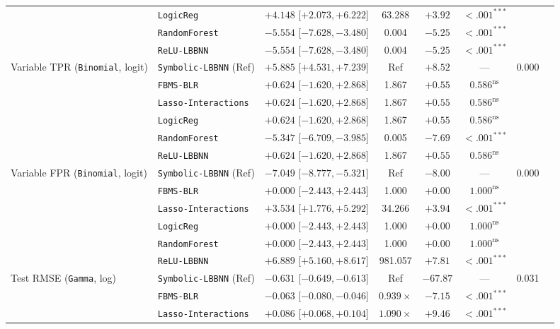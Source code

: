 \begin{table}[htbp]
{{\begin{tabular}{llcccccc}
 & \texttt{LogicReg} & $+4.148$ [$+2.073, +6.222$] & 63.288 & $+3.92$ & $<.001^{***}$ &  \\
 & \texttt{RandomForest} & $-5.554$ [$-7.628, -3.480$] & 0.004 & $-5.25$ & $<.001^{***}$ &  \\
 & \texttt{ReLU-LBBNN} & $-5.554$ [$-7.628, -3.480$] & 0.004 & $-5.25$ & $<.001^{***}$ &  \\
\midrule
Variable TPR (\texttt{Binomial}, logit) & \texttt{Symbolic-LBBNN} (Ref) & $+5.885$ [$+4.531, +7.239$] & Ref & $+8.52$ & --- & 0.000 \\
 & \texttt{FBMS-BLR} & $+0.624$ [$-1.620, +2.868$] & 1.867 & $+0.55$ & $0.586^{\text{ns}}$ &  \\
 & \texttt{Lasso-Interactions} & $+0.624$ [$-1.620, +2.868$] & 1.867 & $+0.55$ & $0.586^{\text{ns}}$ &  \\
 & \texttt{LogicReg} & $+0.624$ [$-1.620, +2.868$] & 1.867 & $+0.55$ & $0.586^{\text{ns}}$ &  \\
 & \texttt{RandomForest} & $-5.347$ [$-6.709, -3.985$] & 0.005 & $-7.69$ & $<.001^{***}$ &  \\
 & \texttt{ReLU-LBBNN} & $+0.624$ [$-1.620, +2.868$] & 1.867 & $+0.55$ & $0.586^{\text{ns}}$ &  \\
\midrule
Variable FPR (\texttt{Binomial}, logit) & \texttt{Symbolic-LBBNN} (Ref) & $-7.049$ [$-8.777, -5.321$] & Ref & $-8.00$ & --- & 0.000 \\
 & \texttt{FBMS-BLR} & $+0.000$ [$-2.443, +2.443$] & 1.000 & $+0.00$ & $1.000^{\text{ns}}$ &  \\
 & \texttt{Lasso-Interactions} & $+3.534$ [$+1.776, +5.292$] & 34.266 & $+3.94$ & $<.001^{***}$ &  \\
 & \texttt{LogicReg} & $+0.000$ [$-2.443, +2.443$] & 1.000 & $+0.00$ & $1.000^{\text{ns}}$ &  \\
 & \texttt{RandomForest} & $+0.000$ [$-2.443, +2.443$] & 1.000 & $+0.00$ & $1.000^{\text{ns}}$ &  \\
 & \texttt{ReLU-LBBNN} & $+6.889$ [$+5.160, +8.617$] & 981.057 & $+7.81$ & $<.001^{***}$ &  \\
\midrule
Test RMSE (\texttt{Gamma}, log) & \texttt{Symbolic-LBBNN} (Ref) & $-0.631$ [$-0.649, -0.613$] & Ref & $-67.87$ & --- & 0.031 \\
 & \texttt{FBMS-BLR} & $-0.063$ [$-0.080, -0.046$] & $0.939\times$ & $-7.15$ & $<.001^{***}$ &  \\
 & \texttt{Lasso-Interactions} & $+0.086$ [$+0.068, +0.104$] & $1.090\times$ & $+9.46$ & $<.001^{***}$ &  \\

\end{tabular}}}
\end{table}
